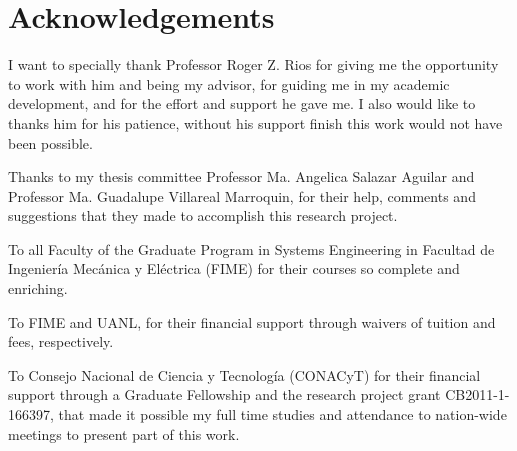 
\chapter{Acknowledgements}

I want to specially thank
Professor Roger Z. Rios
for giving me the opportunity to work with him
and being my advisor,
for guiding me in my academic development,
and for the effort and support he gave me.
I also would like to thanks him
for his patience,
without his support
finish this work
would not have been possible. 

Thanks to my thesis committee
Professor Ma. Angelica Salazar Aguilar
and Professor Ma. Guadalupe Villareal Marroquin,
for their help,
comments and suggestions
that they made
to accomplish this research project.

To all Faculty
of the Graduate Program in Systems Engineering
in Facultad de Ingenier\'ia Mec\'anica y El\'ectrica
(FIME)
for their courses so complete and enriching.

To FIME
and UANL,
for their financial support
through waivers of tuition and fees,
respectively.

To Consejo Nacional de Ciencia y Tecnología (CONACyT)
for their financial support
through a Graduate Fellowship
and the research project grant CB2011-1-166397,
that made it possible
my full time studies
and attendance
to nation-wide meetings
to present part of this work.

